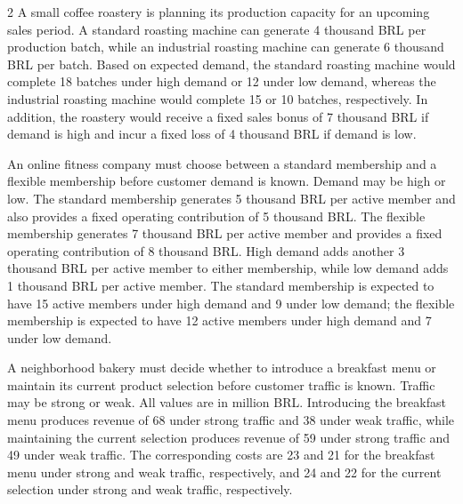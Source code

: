 \begin{multicols}{2}
		A small coffee roastery is planning its production capacity for an upcoming sales period. A standard roasting machine can generate 4 thousand BRL per production batch, while an industrial roasting machine can generate 6 thousand BRL per batch. Based on expected demand, the standard roasting machine would complete 18 batches under high demand or 12 under low demand, whereas the industrial roasting machine would complete 15 or 10 batches, respectively. In addition, the roastery would receive a fixed sales bonus of 7 thousand BRL if demand is high and incur a fixed loss of 4 thousand BRL if demand is low.
		
		\columnbreak
		
		An online fitness company must choose between a standard membership and a flexible membership before customer demand is known. Demand may be high or low. The standard membership generates 5 thousand BRL per active member and also provides a fixed operating contribution of 5 thousand BRL. The flexible membership generates 7 thousand BRL per active member and provides a fixed operating contribution of 8 thousand BRL. High demand adds another 3 thousand BRL per active member to either membership, while low demand adds 1 thousand BRL per active member. The standard membership is expected to have 15 active members under high demand and 9 under low demand; the flexible membership is expected to have 12 active members under high demand and 7 under low demand.
		
		A neighborhood bakery must decide whether to introduce a breakfast menu or maintain its current product selection before customer traffic is known. Traffic may be strong or weak. All values are in million BRL. Introducing the breakfast menu produces revenue of 68 under strong traffic and 38 under weak traffic, while maintaining the current selection produces revenue of 59 under strong traffic and 49 under weak traffic. The corresponding costs are 23 and 21 for the breakfast menu under strong and weak traffic, respectively, and 24 and 22 for the current selection under strong and weak traffic, respectively.
		
				\columnbreak
		

\end{multicols}
